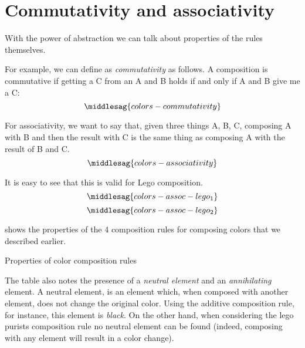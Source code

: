 \section{Commutativity and associativity}

With the power of abstraction we can talk about properties of the rules themselves.

For example, we can define as \emph{commutativity} as follows.
A composition is commutative if getting a C from an A and B holds if and only if A and B give me a C:
\begin{equation}
	\label{eq:colors-commutativity}
	\middlesag{colors-commutativity}
\end{equation}

For associativity, we want to say that, given three things A, B, C, composing A with B and then the result with C is the same thing as composing A with the result of B and C.
\begin{equation}
	\label{eq:colors-associativity}
	\middlesag{colors-associativity}
\end{equation}

It is easy to see that this is valid for Lego composition.
\begin{equation}
	\label{eq:colors-assoc-legoa}
	\middlesag{colors-assoc-lego_1}
\end{equation}
\begin{equation}
	\label{eq:colors-assoc-legob}
	\middlesag{colors-assoc-lego_2}
\end{equation}

 shows the properties of the 4 composition rules for composing colors that we described earlier.

\begin{table*}[p]
	\caption{Properties of color composition rules}
	\label{tab:color-properties}
\end{table*}

The table also notes the presence of a \emph{neutral element} and an \emph{annihilating} element.
A neutral element, is an element which, when composed with another element, does not change the original color.
Using the additive composition rule, for instance, this element is \emph{black}.
On the other hand, when considering the lego purists composition rule no neutral element can be found (indeed, composing with any element will result in a color change).


